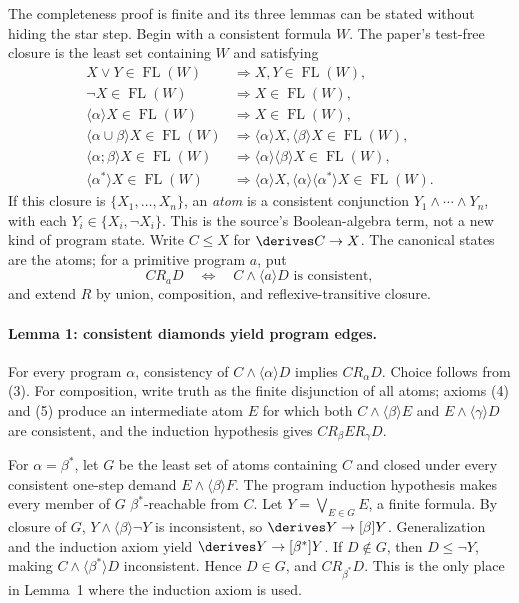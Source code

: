 The completeness proof is finite and its three lemmas can be stated without
hiding the star step.  Begin with a consistent formula \(W\).  The paper's
test-free closure is the least set containing \(W\) and satisfying
\[
\begin{array}{ll}
 X\lor Y\in\operatorname{FL}(W)&\Rightarrow X,Y\in\operatorname{FL}(W),\\
 \neg X\in\operatorname{FL}(W)&\Rightarrow X\in\operatorname{FL}(W),\\
 \langle\alpha\rangle X\in\operatorname{FL}(W)&\Rightarrow X\in\operatorname{FL}(W),\\
 \langle\alpha\cup\beta\rangle X\in\operatorname{FL}(W)
   &\Rightarrow\langle\alpha\rangle X,\langle\beta\rangle X
     \in\operatorname{FL}(W),\\
 \langle\alpha;\beta\rangle X\in\operatorname{FL}(W)
   &\Rightarrow\langle\alpha\rangle\langle\beta\rangle X
     \in\operatorname{FL}(W),\\
 \langle\alpha^{*}\rangle X\in\operatorname{FL}(W)
   &\Rightarrow\langle\alpha\rangle X,
     \langle\alpha\rangle\langle\alpha^{*}\rangle X
     \in\operatorname{FL}(W).
\end{array}
\]
If this closure is \(\{X_1,\ldots,X_n\}\), an \emph{atom} is a consistent
conjunction \(Y_1\land\cdots\land Y_n\), with each
\(Y_i\in\{X_i,\neg X_i\}\).  This is the source's Boolean-algebra term, not a
new kind of program state.  Write \(C\leq X\) for
\(\derives C\to X\).  The canonical states are the atoms; for a primitive
program \(a\), put
\[
 C R_a D
 \quad\Longleftrightarrow\quad
 C\land\langle a\rangle D\text{ is consistent},
\]
and extend \(R\) by union, composition, and reflexive-transitive closure.

\paragraph{Lemma 1: consistent diamonds yield program edges.}
For every program \(\alpha\), consistency of
\(C\land\langle\alpha\rangle D\) implies \(C R_\alpha D\).  Choice follows
from (3).  For composition, write truth as the finite disjunction of all atoms;
axioms (4) and (5) produce an intermediate atom \(E\) for which both
\(C\land\langle\beta\rangle E\) and
\(E\land\langle\gamma\rangle D\) are consistent, and the induction hypothesis
gives \(C R_\beta E R_\gamma D\).

For \(\alpha=\beta^{*}\), let \(G\) be the least set of atoms containing \(C\)
and closed under every consistent one-step demand
\(E\land\langle\beta\rangle F\).  The program induction hypothesis makes every
member of \(G\) \(\beta^{*}\)-reachable from \(C\).  Let
\(Y=\bigvee_{E\in G}E\), a finite formula.  By closure of \(G\),
\(Y\land\langle\beta\rangle\neg Y\) is inconsistent, so
\(\derives Y\to[\beta]Y\).  Generalization and the induction axiom yield
\(\derives Y\to[\beta^{*}]Y\).  If \(D\notin G\), then
\(D\leq\neg Y\), making
\(C\land\langle\beta^{*}\rangle D\) inconsistent.  Hence \(D\in G\), and
\(C R_{\beta^{*}}D\).  This is the only place in Lemma~1 where the induction
axiom is used.

